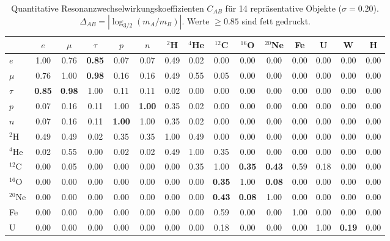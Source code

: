 \documentclass[11pt,a4paper]{article}
\begin{document}
	\begin{table}[H]
		\centering
		\caption{Quantitative Resonanzwechselwirkungskoeffizienten \(C_{AB}\) für 14 repräsentative Objekte (\(\sigma = 0.20\)). \(\Delta_{AB} = |\log_{3/2}(m_A/m_B)|\). Werte \(\ge 0.85\) sind fett gedruckt.}
		\label{tab:CAB}
		\scriptsize
		\begin{tabular}{l c c c c c c c c c c c c c c}
			\toprule
			& \(e\) & \(\mu\) & \(\tau\) & \(p\) & \(n\) & \(^2\)H & \(^4\)He & \(^{12}\)C & \(^{16}\)O & \(^{20}\)Ne & Fe & U & W & H \\
			\midrule
			\(e\) & 1.00 & 0.76 & \textbf{0.85} & 0.07 & 0.07 & 0.49 & 0.02 & 0.00 & 0.00 & 0.00 & 0.00 & 0.00 & 0.00 & 0.00 \\
			\(\mu\) & 0.76 & 1.00 & \textbf{0.98} & 0.16 & 0.16 & 0.49 & 0.55 & 0.05 & 0.00 & 0.00 & 0.00 & 0.00 & 0.00 & 0.00 \\
			\(\tau\) & \textbf{0.85} & \textbf{0.98} & 1.00 & 0.11 & 0.11 & 0.02 & 0.00 & 0.00 & 0.00 & 0.00 & 0.00 & 0.00 & 0.00 & 0.00 \\
			\(p\) & 0.07 & 0.16 & 0.11 & 1.00 & \textbf{1.00} & 0.35 & 0.02 & 0.00 & 0.00 & 0.00 & 0.00 & 0.00 & 0.00 & 0.00 \\
			\(n\) & 0.07 & 0.16 & 0.11 & \textbf{1.00} & 1.00 & 0.35 & 0.02 & 0.00 & 0.00 & 0.00 & 0.00 & 0.00 & 0.00 & 0.00 \\
			\(^2\)H & 0.49 & 0.49 & 0.02 & 0.35 & 0.35 & 1.00 & 0.49 & 0.00 & 0.00 & 0.00 & 0.00 & 0.00 & 0.00 & 0.00 \\
			\(^4\)He & 0.02 & 0.55 & 0.00 & 0.02 & 0.02 & 0.49 & 1.00 & 0.35 & 0.00 & 0.00 & 0.00 & 0.00 & 0.00 & 0.00 \\
			\(^{12}\)C & 0.00 & 0.05 & 0.00 & 0.00 & 0.00 & 0.00 & 0.35 & 1.00 & \textbf{0.35} & \textbf{0.43} & 0.59 & 0.18 & 0.00 & 0.00 \\
			\(^{16}\)O & 0.00 & 0.00 & 0.00 & 0.00 & 0.00 & 0.00 & 0.00 & \textbf{0.35} & 1.00 & \textbf{0.08} & 0.00 & 0.00 & 0.00 & 0.00 \\
			\(^{20}\)Ne & 0.00 & 0.00 & 0.00 & 0.00 & 0.00 & 0.00 & 0.00 & \textbf{0.43} & \textbf{0.08} & 1.00 & 0.00 & 0.00 & 0.00 & 0.00 \\
			Fe & 0.00 & 0.00 & 0.00 & 0.00 & 0.00 & 0.00 & 0.00 & 0.59 & 0.00 & 0.00 & 1.00 & 0.00 & 0.00 & 0.00 \\
			U & 0.00 & 0.00 & 0.00 & 0.00 & 0.00 & 0.00 & 0.00 & 0.18 & 0.00 & 0.00 & 0.00 & 1.00 & \textbf{0.19} & 0.00 \\

\end{tabular}
\end{table}
\end{document}
